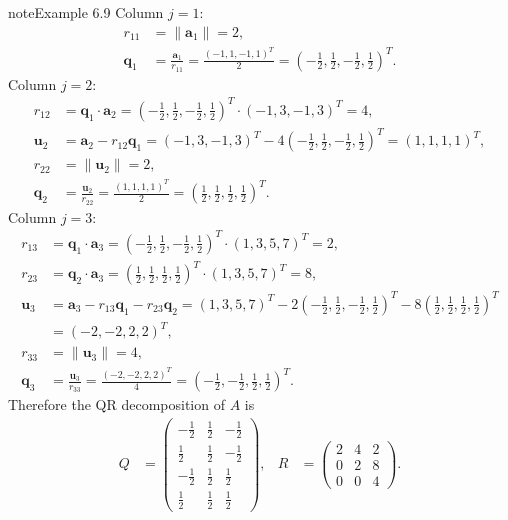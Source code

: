\documentclass[letterpaper,10pt,english]{jupyterBook}
\begin{document}
\begin{sphinxadmonition}{note}{Example 6.9}
\sphinxAtStartPar
Column \(j=1\):
\begin{align*}
    r_{11} &=\|\mathbf{a}_1 \|=2,\\
    \mathbf{q}_1 &=\frac{\mathbf{a}_1 }{r_{11}} = \frac{(-1, 1, -1, 1)^T}{2} = (-\tfrac{1}{2}, \tfrac{1}{2}, -\tfrac{1}{2}, \tfrac{1}{2})^T.
\end{align*}
\sphinxAtStartPar
Column \(j=2\):
\begin{align*}
    r_{12} &=\mathbf{q}_1 \cdot \mathbf{a}_2 =
    ( -\tfrac{1}{2}, \tfrac{1}{2}, -\tfrac{1}{2}, \tfrac{1}{2})^T \cdot 
    (-1, 3, -1, 3)^T = 4, \\
    \mathbf{u}_2 &=\mathbf{a}_2 -r_{12} \mathbf{q}_1 = (-1, 3, -1, 3)^T - 4
    (-\tfrac{1}{2}, \tfrac{1}{2}, -\tfrac{1}{2}, \tfrac{1}{2})^T = 
    (1, 1, 1, 1)^T,\\
    r_{22} &=\|\mathbf{u}_2 \| = 2,\\
    \mathbf{q}_2 &=\frac{\mathbf{u}_2 }{r_{22}} = \frac{(1, 1, 1, 1)^T}{2} = 
    (\tfrac{1}{2}, \tfrac{1}{2}, \tfrac{1}{2}, \tfrac{1}{2})^T.
\end{align*}
\sphinxAtStartPar
Column \(j=3\):
\begin{align*}
    r_{13} &=\mathbf{q}_1 \cdot \mathbf{a}_3 =
    (-\tfrac{1}{2}, \tfrac{1}{2}, -\tfrac{1}{2}, \tfrac{1}{2})^T \cdot 
    (1, 3, 5, 7)^T = 2,\\
    r_{23} &=\mathbf{q}_2 \cdot \mathbf{a}_3 =
    (\tfrac{1}{2}, \tfrac{1}{2}, \tfrac{1}{2}, \tfrac{1}{2})^T \cdot
    (1, 3, 5, 7)^T = 8,\\
    \mathbf{u}_3 &= \mathbf{a}_3 - r_{13} \mathbf{q}_1 - r_{23} \mathbf{q}_2 =
    (1, 3, 5, 7)^T - 2 (-\tfrac{1}{2}, \tfrac{1}{2}, -\tfrac{1}{2}, \tfrac{1}{2})^T - 8
    (\tfrac{1}{2}, \tfrac{1}{2}, \tfrac{1}{2}, \tfrac{1}{2})^T \\
    &= (-2, -2, 2, 2)^T,\\
    r_{33} &= \|\mathbf{u}_3 \| = 4,\\
    \mathbf{q}_3 &= \frac{\mathbf{u}_3 }{r_{33}} = \frac{(-2, -2, 2, 2)^T}{4} = 
    (-\tfrac{1}{2}, -\tfrac{1}{2}, \tfrac{1}{2}, \tfrac{1}{2})^T.
\end{align*}
\sphinxAtStartPar
Therefore the QR decomposition of \(A\) is
\begin{align*}
    Q &= \begin{pmatrix}
        -\frac{1}{2} & \frac{1}{2} & -\frac{1}{2}\\
        \frac{1}{2} & \frac{1}{2} & -\frac{1}{2}\\
        -\frac{1}{2} & \frac{1}{2} & \frac{1}{2}\\
        \frac{1}{2} & \frac{1}{2} & \frac{1}{2}
    \end{pmatrix}, &
    R &= \begin{pmatrix}
        2 & 4 & 2\\
        0 & 2 & 8\\
        0 & 0 & 4
    \end{pmatrix}.
\end{align*}\end{sphinxadmonition}
\end{document}
